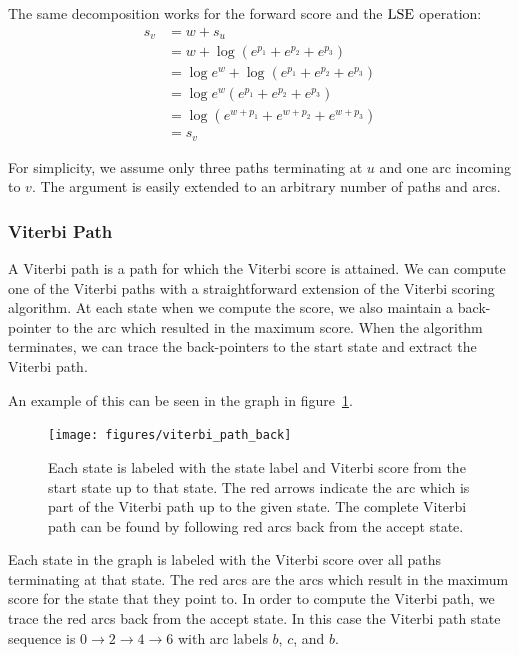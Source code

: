 The same decomposition works for the forward score and the $\operatorname*{\textrm{LSE}}$ operation:
\begin{align*}
s_v &= w + s_u  \\
    &= w + \log \left(e^{p_1} + e^{p_2} + e^{p_3}\right) \\
    &= \log e^w + \log \left(e^{p_1} + e^{p_2} + e^{p_3}\right) \\
    &= \log e^w \left(e^{p_1} + e^{p_2} + e^{p_3}\right) \\
    &= \log \left(e^{w + p_1} + e^{w + p_2} + e^{w + p_3}\right) \\
    &= s_v
\end{align*}

For simplicity, we assume only three paths terminating at $u$ and one arc
incoming to $v$. The argument is easily extended to an arbitrary number of
paths and arcs.

\subsubsection{Viterbi Path}

A Viterbi path is a path for which the Viterbi score is attained. We can
compute one of the Viterbi paths with a straightforward extension of the
Viterbi scoring algorithm. At each state when we compute the score, we also
maintain a back-pointer to the arc which resulted in the maximum score. When the
algorithm terminates, we can trace the back-pointers to the start state and
extract the Viterbi path.

An example of this can be seen in the graph in
figure~\ref{fig:viterbi_path_back}.

\begin{figure}
    \centering
    \texttt{[image: figures/viterbi\_path\_back]}
    \caption{Each state is labeled with the state label and Viterbi score from
    the start state up to that state. The red arrows indicate the arc which is
    part of the Viterbi path up to the given state. The complete Viterbi path
    can be found by following red arcs back from the accept state.}
    \label{fig:viterbi_path_back}
\end{figure}

Each state in the graph is labeled with the Viterbi score over all paths
terminating at that state. The red arcs are the arcs which result in the
maximum score for the state that they point to. In order to compute the Viterbi
path, we trace the red arcs back from the accept state. In this case the
Viterbi path state sequence is $0 \rightarrow 2 \rightarrow 4 \rightarrow 6$
with arc labels $b$, $c$, and $b$.

